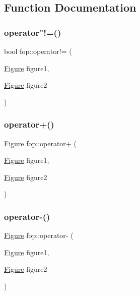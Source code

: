\subsection{Function Documentation}
\mbox{\label{namespacefop_a386a3d90ae69e900125c0a3ad5c48cdf}} 
\subsubsection{\texorpdfstring{operator"!=()}{operator!=()}}
{\footnotesize\ttfamily bool fop\+::operator!= (\begin{DoxyParamCaption}\item[{\mbox{\hyperlink{classfop_1_1_figure}{Figure}}}]{figure1,  }\item[{\mbox{\hyperlink{classfop_1_1_figure}{Figure}}}]{figure2 }\end{DoxyParamCaption})}

\mbox{\label{namespacefop_a0cdacf03236287528189a51913750a8c}} 
\subsubsection{\texorpdfstring{operator+()}{operator+()}}
{\footnotesize\ttfamily \mbox{\hyperlink{classfop_1_1_figure}{Figure}} fop\+::operator+ (\begin{DoxyParamCaption}\item[{\mbox{\hyperlink{classfop_1_1_figure}{Figure}}}]{figure1,  }\item[{\mbox{\hyperlink{classfop_1_1_figure}{Figure}}}]{figure2 }\end{DoxyParamCaption})}

\mbox{\label{namespacefop_ab4ccc3243195b647632a36db88113230}} 
\subsubsection{\texorpdfstring{operator-\/()}{operator-()}}
{\footnotesize\ttfamily \mbox{\hyperlink{classfop_1_1_figure}{Figure}} fop\+::operator-\/ (\begin{DoxyParamCaption}\item[{\mbox{\hyperlink{classfop_1_1_figure}{Figure}}}]{figure1,  }\item[{\mbox{\hyperlink{classfop_1_1_figure}{Figure}}}]{figure2 }\end{DoxyParamCaption})}

